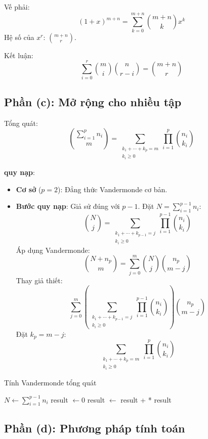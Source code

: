 \documentclass[a4paper,12pt]{article}
\theoremstyle{plain}
\theoremstyle{definition}
\begin{document}
Vế phải:
\[
(1+x)^{m+n} = \sum_{k=0}^{m+n} \binom{m+n}{k}x^k
\]
Hệ số của \( x^r \): \( \binom{m+n}{r} \).

Kết luận:
\[
\sum_{i=0}^r \binom{m}{i}\binom{n}{r-i} = \binom{m+n}{r}
\]


\subsection*{Phần (c): Mở rộng cho nhiều tập}

Tổng quát:
\[
\binom{\sum_{i=1}^p n_i}{m} = \sum_{\substack{k_1+\cdots+k_p=m \\ k_i \geq 0}} \prod_{i=1}^p \binom{n_i}{k_i}
\]

\textbf{quy nạp}:
\begin{itemize}
    \item \textbf{Cơ sở} (\( p=2 \)): Đẳng thức Vandermonde cơ bản.
    \item \textbf{Bước quy nạp}: Giả sử đúng với \( p-1 \). Đặt \( N = \sum_{i=1}^{p-1} n_i \):
    \[
    \binom{N}{j} = \sum_{\substack{k_1+\cdots+k_{p-1}=j \\ k_i \geq 0}} \prod_{i=1}^{p-1} \binom{n_i}{k_i}
    \]
    Áp dụng Vandermonde:
    \[
    \binom{N+n_p}{m} = \sum_{j=0}^m \binom{N}{j}\binom{n_p}{m-j}
    \]
    Thay giả thiết:
    \[
    \sum_{j=0}^m \left( \sum_{\substack{k_1+\cdots+k_{p-1}=j \\ k_i \geq 0}} \prod_{i=1}^{p-1} \binom{n_i}{k_i} \right) \binom{n_p}{m-j}
    \]
    Đặt \( k_p = m-j \):
    \[
    \sum_{\substack{k_1+\cdots+k_p=m \\ k_i \geq 0}} \prod_{i=1}^p \binom{n_i}{k_i}
    \]
\end{itemize}

\begin{algorithm}
\caption{Tính Vandermonde tổng quát}
\begin{algorithmic}
     \Return {}
    \EndIf
    \State $N \gets \sum_{i=1}^{p-1} n_i$
    \State result $\gets 0$
        \State result $\gets$ result +  * 
    \EndFor
    \State \Return result
\EndFunction
\end{algorithmic}
\end{algorithm}

\subsection*{Phần (d): Phương pháp tính toán}
\end{document}
